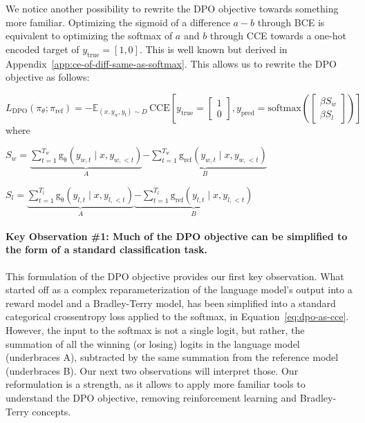 \documentclass[twoside,11pt]{article}
\begin{document}
We notice another possibility to rewrite the DPO objective towards something
more familiar. Optimizing the sigmoid of a difference $a-b$ through BCE 
is equivalent to optimizing the softmax of $a$ and $b$ through CCE towards 
a one-hot encoded target of $y_\mathrm{true} = [1, 0]$. 
This is well known
but derived in Appendix~\ref{app:ce-of-diff-same-as-softmax}. This allows
us to rewrite the DPO objective as follows:

\begin{equation}
\label{eq:dpo-as-cce}
L_\mathrm{DPO}(\pi_\theta; \pi_\mathrm{ref}) = 
-\mathbb{E}_{(x, y_w, y_l) \sim D} \, 
\text{CCE}
\left[
  y_\mathrm{true} = 
    \begin{bmatrix}
    1 \\ 
    0
    \end{bmatrix}
  ,
  y_\mathrm{pred} = 
    \text{softmax}
    \left(
    \begin{bmatrix}
    \beta S_w \\ 
    \beta S_l
    \end{bmatrix}
  \right)
\right]
\end{equation}
where
\begin{description}
\item
$ S_w = 
  \underbrace{
    \sum_{t=1}^{T_w} \mathrm{g_\theta}(y_{w,t} \mid x, y_{w,<t}) 
    }_{A}
    \underbrace{
  - 
  \sum_{t=1}^{T_w}\mathrm{g_\mathrm{ref}}(y_{w,t} \mid x, y_{w,<t})
  }_{B}
$
\item
$
S_l = 
  \underbrace{
    \sum_{t=1}^{T_l} \mathrm{g_\theta}(y_{l,t} \mid x, y_{l,<t}) 
  }_{A}
  \underbrace{
  - 
  \sum_{t=1}^{T_l} \mathrm{g_\mathrm{ref}}(y_{l,t} \mid x, y_{l,<t})
  }_{B}
$
\end{description}

\paragraph{Key Observation \#1: Much of the DPO objective 
can be simplified to the form of a 
standard classification task.} \label{obs:dpo-as-cce}
This formulation of the DPO objective provides our first key observation. 
What started off as a complex reparameterization 
of the language model's output into a reward
model and a Bradley-Terry model, 
has been simplified into a standard 
categorical crossentropy loss applied to the softmax, in
Equation~\ref{eq:dpo-as-cce}. However, the
input to the softmax is not a single logit, but rather, the 
summation of all the winning (or losing) logits in the language model
(underbraces A), 
subtracted by the same summation from the reference model (underbraces B).
Our next two observations will interpret those. Our reformulation
is a strength, as it allows to apply more familiar tools to understand
the DPO objective, removing reinforcement learning and Bradley-Terry concepts. 
\end{document}
